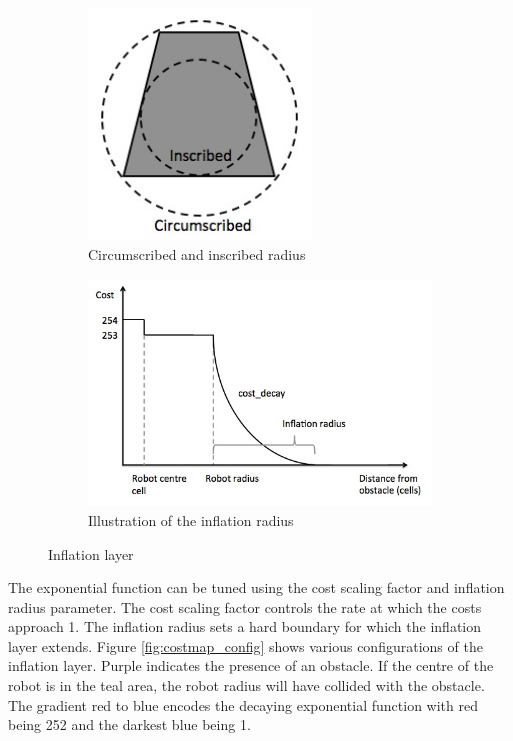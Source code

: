 \documentclass[capstone_report.tex]{subfiles}
\begin{document}
\begin{figure}[H]
    \centering
    \begin{subfigure}{0.5\textwidth}
        \centering
        \includegraphics[width=0.65\textwidth]{./imgs/circumscribed.jpg}
        \caption{Circumscribed and inscribed radius}
        \label{fig:circumscribed}
    \end{subfigure}%
    \begin{subfigure}{0.5\textwidth}
        \centering
        \includegraphics[width=1.1\textwidth]{./imgs/inflation_radius.jpg}
        \caption{Illustration of the inflation radius}
        \label{fig:inflation_radius}
    \end{subfigure}
    \caption{Inflation layer\label{fig:inflation_layer}}
\end{figure}

The exponential function can be tuned using the cost scaling factor and inflation radius parameter.  The cost scaling factor controls the rate at which the costs approach 1.  The inflation radius sets a hard boundary for which the inflation layer extends.  Figure \ref{fig:costmap_config} shows various configurations of the inflation layer.  Purple indicates the presence of an obstacle.  If the centre of the robot is in the teal area, the robot radius will have collided with the obstacle.  The gradient red to blue encodes the decaying exponential function with red being 252 and the darkest blue being 1.\\
\end{document}
